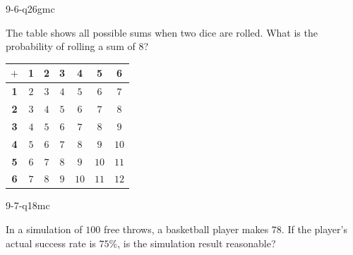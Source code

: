 \begin{practiceQuestion}{9-6-q26}{gmc}
\begin{questionText}
The table shows all possible sums when two dice are rolled. What is the probability of rolling a sum of $8$?

\begin{center}
\begin{tabular}{|c|c|c|c|c|c|c|}
\hline
$+$ & \textbf{1} & \textbf{2} & \textbf{3} & \textbf{4} & \textbf{5} & \textbf{6} \\
\hline
\textbf{1} & $2$ & $3$ & $4$ & $5$ & $6$ & $7$ \\
\hline
\textbf{2} & $3$ & $4$ & $5$ & $6$ & $7$ & \cellcolor{funBlue!20}$8$ \\
\hline
\textbf{3} & $4$ & $5$ & $6$ & $7$ & \cellcolor{funBlue!20}$8$ & $9$ \\
\hline
\textbf{4} & $5$ & $6$ & $7$ & \cellcolor{funBlue!20}$8$ & $9$ & $10$ \\
\hline
\textbf{5} & $6$ & $7$ & \cellcolor{funBlue!20}$8$ & $9$ & $10$ & $11$ \\
\hline
\textbf{6} & $7$ & \cellcolor{funBlue!20}$8$ & $9$ & $10$ & $11$ & $12$ \\
\hline
\end{tabular}
\end{center}
\end{questionText}
\end{practiceQuestion}

\begin{practiceQuestion}{9-7-q18}{mc}
\begin{questionText}
In a simulation of $100$ free throws, a basketball player makes $78$. If the player's actual success rate is $75\%$, is the simulation result reasonable?
\end{questionText}
\end{practiceQuestion}
